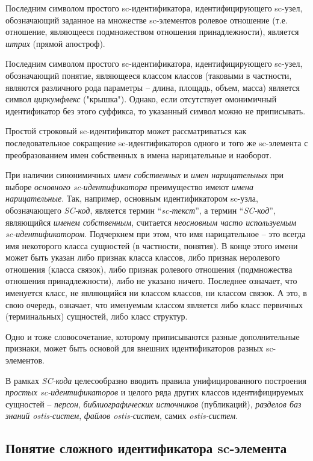 Последним символом простого sc-идентификатора, идентифицирующего sc-узел, обозначающий заданное на множестве sc-элементов ролевое отношение (т.е. отношение, являющееся подмножеством отношения принадлежности), является \textit{штрих} (прямой апостроф).

Последним символом простого sc-идентификатора, идентифицирующего sc-узел, обозначающий понятие, являющееся классом классов (таковыми в частности, являются различного рода параметры -- длина, площадь, объем, масса) является символ \textit{циркумфлекс} ("крышка"). Однако, если отсутствует омонимичный идентификатор без этого суффикса, то указанный символ можно не приписывать.

Простой строковый sc-идентификатор может рассматриваться как последовательное сокращение sc-идентификаторов одного и того же sc-элемента с преобразованием имен собственных в имена нарицательные и наоборот.

При наличии синонимичных \textit{имен собственных} и \textit{имен нарицательных} при выборе \textit{основного sc-идентификатора} преимущество имеют \textit{имена нарицательные}. Так, например, основным идентификатором sc-узла, обозначающего \textit{SC-код}, является термин ``\textit{sc-текст}'', а термин ``\textit{SC-код}'', являющийся \textit{именем собственным}, считается \textit{неосновным часто используемым sc-идентификатором}. Подчеркнем при этом, что имя нарицательное -- это всегда имя некоторого класса сущностей (в частности, понятия). В конце этого имени может быть указан либо признак класса классов, либо признак неролевого отношения (класса связок), либо признак ролевого отношения (подмножества отношения принадлежности), либо не указано ничего. Последнее означает, что именуется класс, не являющийся ни классом классов, ни классом связок. А это, в свою очередь, означает, что именуемым классом является либо класс первичных (терминальных) сущностей, либо класс структур.

Одно и тоже словосочетание, которому приписываются разные дополнительные признаки, может быть основой для внешних идентификаторов разных sc-элементов.

В рамках \textit{SC-кода} целесообразно вводить правила унифицированного построения \textit{простых sc-идентификаторов} и целого ряда других классов идентифицируемых сущностей -- \textit{персон}, \textit{библиографических источников} (публикаций), \textit{разделов баз знаний ostis-систем}, \textit{файлов ostis-систем}, самих \textit{ostis-систем}.


\subsection{Понятие сложного идентификатора sc-элемента}

